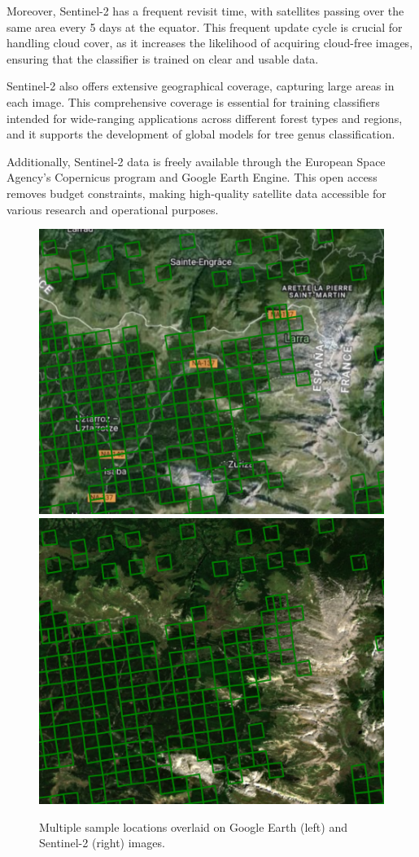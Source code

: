 Moreover, Sentinel-2 has a frequent revisit time, with satellites passing over the same 
area every 5 days at the equator. This frequent update cycle is crucial for handling 
cloud cover, as it increases the likelihood of acquiring cloud-free images, 
ensuring that the classifier is trained on clear and usable data.

Sentinel-2 also offers extensive geographical coverage, capturing large areas in each image. 
This comprehensive coverage is essential for training classifiers intended 
for wide-ranging applications across different forest types and regions, 
and it supports the development of global models for tree genus classification.

Additionally, Sentinel-2 data is freely available through the European Space Agency's 
Copernicus program and Google Earth Engine. This open access removes budget constraints, 
making high-quality satellite data accessible for various research and operational purposes.

\begin{figure}[!thb]
    \centering

    \includegraphics[width=0.48\linewidth]{figures/figures_sentinel/sample_area_earth.png}
    \includegraphics[width=0.48\linewidth]{figures/figures_sentinel/sample_area_sentinel.png}

    \caption{Multiple sample locations overlaid on Google Earth (left) and Sentinel-2 (right) images.}
    \label{fig:_label_sample_area}
\end{figure}

